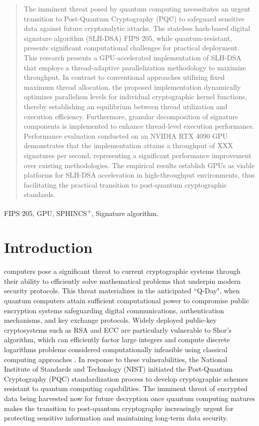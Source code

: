 \documentclass[journal]{IEEEtran}
\begin{document}
\begin{abstract}
  The imminent threat posed by quantum computing necessitates an urgent transition to Post-Quantum Cryptography (PQC) to safeguard sensitive data against future cryptanalytic attacks.
  The stateless hash-based digital signature algorithm (SLH-DSA) FIPS 205, while quantum-resistant, presents significant computational challenges for practical deployment.
  This research presents a GPU-accelerated implementation of SLH-DSA that employs a thread-adaptive parallelization methodology to maximize throughput.
  In contrast to conventional approaches utilizing fixed maximum thread allocation, the proposed implementation dynamically optimizes parallelism levels for individual cryptographic kernel functions, thereby establishing an equilibrium between thread utilization and execution efficiency.
  Furthermore, granular decomposition of signature components is implemented to enhance thread-level execution performance.
  Performance evaluation conducted on an NVIDIA RTX 4090 GPU demonstrates that the implementation attains a throughput of XXX signatures per second, representing a significant performance improvement over existing methodologies.
  The empirical results establish GPUs as viable platforms for SLH-DSA acceleration in high-throughput environments, thus facilitating the practical transition to post-quantum cryptographic standards.

\end{abstract}

\begin{IEEEkeywords}
  FIPS 205, GPU, SPHINCS\textsuperscript{+}, Signature algorithm.
\end{IEEEkeywords}

\section{Introduction}
\label{sec:intro}

 computers pose a significant threat to current cryptographic systems through their ability to efficiently solve mathematical problems that underpin modern security protocols. This threat materializes in the anticipated ``Q-Day", when quantum computers attain sufficient computational power to compromise public encryption systems safeguarding digital communications, authentication mechanisms, and key exchange protocols. Widely deployed public-key cryptosystems such as RSA and ECC are particularly vulnerable to Shor's algorithm, which can efficiently factor large integers and compute discrete logarithms problems considered computationally infeasible using classical computing approaches \cite{Yang2023}.
In response to these vulnerabilities, the National Institute of Standards and Technology (NIST) initiated the Post-Quantum Cryptography (PQC) standardization process to develop cryptographic schemes resistant to quantum computing capabilities. The imminent threat of encrypted data being harvested now for future decryption once quantum computing matures makes the transition to post-quantum cryptography increasingly urgent for protecting sensitive information and maintaining long-term data security.
\end{document}
